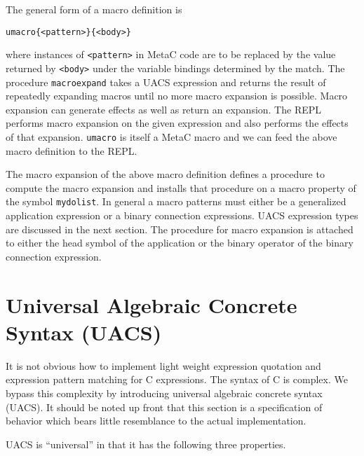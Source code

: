 \documentclass{article}
\begin{document}
The general form of a macro definition is
\begin{verbatim}
umacro{<pattern>}{<body>}
\end{verbatim}
where instances of {\tt <pattern>} in MetaC code are to be replaced by the value returned by {\tt <body>} under the variable bindings determined by the match.
The procedure {\tt macroexpand} takes a UACS expression
and returns the result of repeatedly expanding macros until no more macro expansion is possible.  Macro expansion can generate effects as well as return an expansion.  The REPL performs
macro expansion on the given expression and also performs the effects of that expansion.  {\tt umacro} is itself a MetaC macro and we can feed the above macro definition to the REPL.

The macro expansion of the above macro definition defines a procedure to compute the macro expansion and installs that procedure on a macro property of the symbol {\tt mydolist}.
In general a macro patterns must either be a generalized application expression or a binary connection expressions.  UACS expression types are discussed in the next section.
The procedure for macro expansion is attached to either the head symbol of the application
or the binary operator of the binary connection expression.

\section{Universal Algebraic Concrete Syntax (UACS)}

It is not obvious how to implement light weight expression quotation and expression pattern matching for C expressions.  The syntax of C is complex.
We bypass this complexity by introducing universal algebraic concrete syntax (UACS).  It should be noted up front that this section is a specification
of behavior which bears little resemblance to the actual implementation.

\noindent UACS is ``universal'' in that it has the following three properties.
\end{document}
